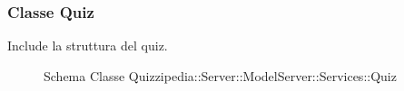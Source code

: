 \subsubsection{Classe Quiz}
Include la struttura del quiz.
\begin{figure}[H]
\centering
\noindent{}
\caption[Schema Classe Quiz]{Schema Classe Quizzipedia::Server::ModelServer::Services::Quiz}
\end{figure}

